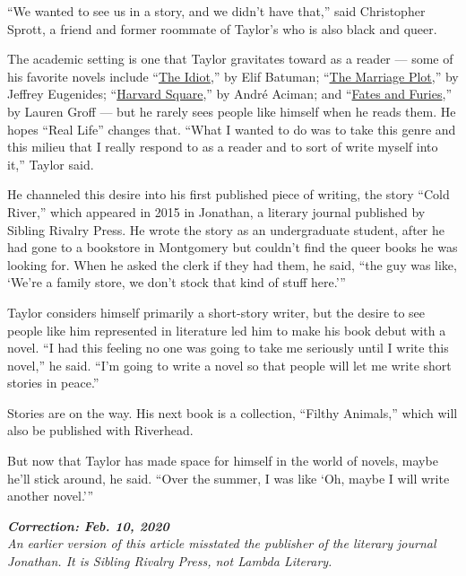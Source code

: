 ``We wanted to see us in a story, and we didn't have that,'' said
Christopher Sprott, a friend and former roommate of Taylor's who is also
black and queer.

The academic setting is one that Taylor gravitates toward as a reader
--- some of his favorite novels include
``\href{https://www.nytimes3xbfgragh.onion/2017/02/28/books/review-elif-batuman-idiot.html}{The
Idiot},'' by Elif Batuman;
``\href{https://www.nytimes3xbfgragh.onion/2011/10/16/books/review/the-marriage-plot-by-jeffrey-eugenides-book-review.html}{The
Marriage Plot},'' by Jeffrey Eugenides;
``\href{https://www.nytimes3xbfgragh.onion/2013/04/11/books/harvard-square-by-andre-aciman.html}{Harvard
Square},'' by André Aciman; and
``\href{https://www.nytimes3xbfgragh.onion/2015/09/13/books/review/lauren-groffs-fates-and-furies.html}{Fates
and Furies},'' by Lauren Groff --- but he rarely sees people like
himself when he reads them. He hopes ``Real Life'' changes that. ``What
I wanted to do was to take this genre and this milieu that I really
respond to as a reader and to sort of write myself into it,'' Taylor
said.

He channeled this desire into his first published piece of writing, the
story ``Cold River,'' which appeared in 2015 in Jonathan, a literary
journal published by Sibling Rivalry Press. He wrote the story as an
undergraduate student, after he had gone to a bookstore in Montgomery
but couldn't find the queer books he was looking for. When he asked the
clerk if they had them, he said, ``the guy was like, `We're a family
store, we don't stock that kind of stuff here.'''

Taylor considers himself primarily a short-story writer, but the desire
to see people like him represented in literature led him to make his
book debut with a novel. ``I had this feeling no one was going to take
me seriously until I write this novel,'' he said. ``I'm going to write a
novel so that people will let me write short stories in peace.''

Stories are on the way. His next book is a collection, ``Filthy
Animals,'' which will also be published with Riverhead.

But now that Taylor has made space for himself in the world of novels,
maybe he'll stick around, he said. ``Over the summer, I was like `Oh,
maybe I will write another novel.'''

\emph{\textbf{Correction: Feb. 10, 2020}}\\
\emph{An earlier version of this article misstated the publisher of the
literary journal Jonathan. It is Sibling Rivalry Press, not Lambda
Literary.}

